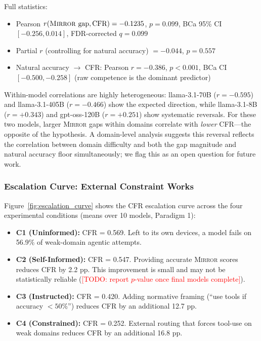 \documentclass[10pt]{article}
\newcommand{\todo}[1]{\textcolor{red}{[TODO: #1]}}
\newcommand{\mirror}{\textsc{Mirror}}
\newcommand{\CFR}{CFR}
\begin{document}
Full statistics:
\begin{itemize}
  \item Pearson $r(\text{\mirror{} gap}, \text{\CFR{}}) = -0.1235$, $p = 0.099$,
    BCa 95\% CI $[-0.256, 0.014]$, FDR-corrected $q = 0.099$
  \item Partial $r$ (controlling for natural accuracy) $= -0.044$, $p = 0.557$
  \item Natural accuracy $\to$ \CFR{}: Pearson $r = -0.386$, $p < 0.001$,
    BCa CI $[-0.500, -0.258]$ (raw competence is the dominant predictor)
\end{itemize}

Within-model correlations are highly heterogeneous: llama-3.1-70B ($r = -0.595$) and
llama-3.1-405B ($r = -0.466$) show the expected direction, while llama-3.1-8B ($r = +0.343$)
and gpt-oss-120B ($r = +0.251$) show systematic reversals. For these two models, larger
\mirror{} gaps within domains correlate with \textit{lower} \CFR{}---the opposite of
the hypothesis. A domain-level analysis suggests this reversal reflects the correlation
between domain difficulty and both the gap magnitude and natural accuracy floor simultaneously;
we flag this as an open question for future work.

\subsubsection{Escalation Curve: External Constraint Works}

Figure~\ref{fig:escalation_curve} shows the \CFR{} escalation curve across the four
experimental conditions (means over 10 models, Paradigm 1):

\begin{itemize}
  \item \textbf{C1 (Uninformed):} \CFR{} = 0.569. Left to its own devices, a model
    fails on 56.9\% of weak-domain agentic attempts.
  \item \textbf{C2 (Self-Informed):} \CFR{} = 0.547. Providing accurate \mirror{}
    scores reduces \CFR{} by 2.2 pp. This improvement is small and may not be
    statistically reliable (\todo{report $p$-value once final models complete}).
  \item \textbf{C3 (Instructed):} \CFR{} = 0.420. Adding normative framing (``use tools
    if accuracy $< 50\%$'') reduces \CFR{} by an additional 12.7 pp.
  \item \textbf{C4 (Constrained):} \CFR{} = 0.252. External routing that forces
    tool-use on weak domains reduces \CFR{} by an additional 16.8 pp.
\end{itemize}
\end{document}
